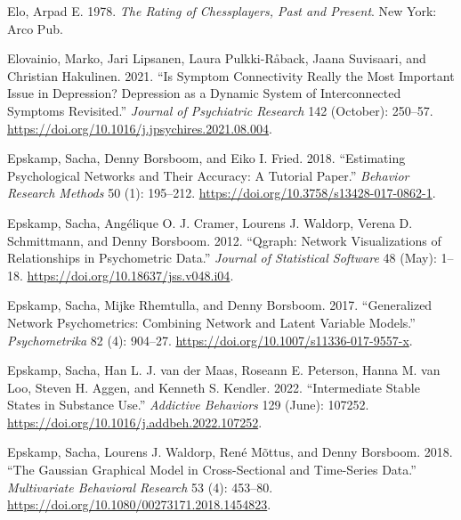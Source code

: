\documentclass[
  a4paper,
  DIV=11,
  numbers=noendperiod]{scrreprt}
\newlength{\cslhangindent}
\newlength{\cslentryspacingunit} %
\newenvironment{CSLReferences}[2] %
 {%
  \setlength{\parindent}{0pt}
  \ifodd #1
  \let\oldpar\par
  \def\par{\hangindent=\cslhangindent\oldpar}
  \fi
  \setlength{\parskip}{#2\cslentryspacingunit}
 }%
 {}
\begin{document}
\begin{CSLReferences}{1}{0}
\leavevmode{}%
Elo, Arpad E. 1978. \emph{The Rating of Chessplayers, Past and Present}.
{New York}: {Arco Pub}.

\leavevmode{}%
Elovainio, Marko, Jari Lipsanen, Laura Pulkki-Råback, Jaana Suvisaari,
and Christian Hakulinen. 2021. {``Is Symptom Connectivity Really the
Most Important Issue in Depression? {Depression} as a Dynamic System of
Interconnected Symptoms Revisited.''} \emph{Journal of Psychiatric
Research} 142 (October): 250--57.
\url{https://doi.org/10.1016/j.jpsychires.2021.08.004}.

\leavevmode{}%
Epskamp, Sacha, Denny Borsboom, and Eiko I. Fried. 2018. {``Estimating
Psychological Networks and Their Accuracy: {A} Tutorial Paper.''}
\emph{Behavior Research Methods} 50 (1): 195--212.
\url{https://doi.org/10.3758/s13428-017-0862-1}.

\leavevmode{}%
Epskamp, Sacha, Angélique O. J. Cramer, Lourens J. Waldorp, Verena D.
Schmittmann, and Denny Borsboom. 2012. {``Qgraph: {Network
Visualizations} of {Relationships} in {Psychometric Data}.''}
\emph{Journal of Statistical Software} 48 (May): 1--18.
\url{https://doi.org/10.18637/jss.v048.i04}.

\leavevmode{}%
Epskamp, Sacha, Mijke Rhemtulla, and Denny Borsboom. 2017.
{``Generalized {Network Psychometrics}: {Combining Network} and {Latent
Variable Models}.''} \emph{Psychometrika} 82 (4): 904--27.
\url{https://doi.org/10.1007/s11336-017-9557-x}.

\leavevmode{}%
Epskamp, Sacha, Han L. J. van der Maas, Roseann E. Peterson, Hanna M.
van Loo, Steven H. Aggen, and Kenneth S. Kendler. 2022. {``Intermediate
Stable States in Substance Use.''} \emph{Addictive Behaviors} 129
(June): 107252. \url{https://doi.org/10.1016/j.addbeh.2022.107252}.

\leavevmode{}%
Epskamp, Sacha, Lourens J. Waldorp, René Mõttus, and Denny Borsboom.
2018. {``The {Gaussian Graphical Model} in {Cross-Sectional} and
{Time-Series Data}.''} \emph{Multivariate Behavioral Research} 53 (4):
453--80. \url{https://doi.org/10.1080/00273171.2018.1454823}.


\end{CSLReferences}
\end{document}
